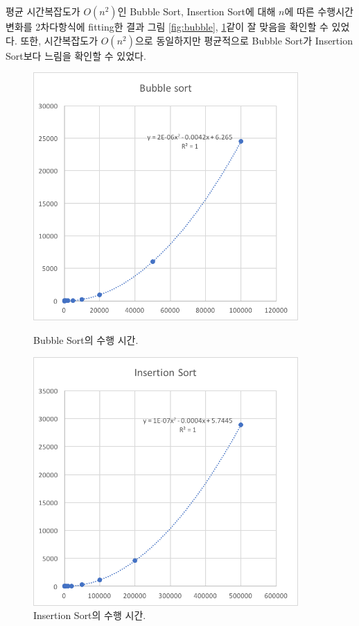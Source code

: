 \documentclass{article}
\begin{document}
	\clearpage
	평균 시간복잡도가 $ O(n^{2}) $인 Bubble Sort, Insertion Sort에 대해
	$ n $에 따른 수행시간 변화를 2차다항식에 fitting한 결과
	그림 \ref{fig:bubble}, \ref{fig:insertion}\와 같이 잘 맞음을 확인할 수 있었다.
	또한, 시간복잡도가 $ O(n^{2}) $으로 동일하지만
	평균적으로 Bubble Sort가 Insertion Sort보다 느림을 확인할 수 있었다.
	\begin{figure}[h]
		\centering
		\hfill
		\begin{minipage}{0.45\textwidth}
			\centering
			\includegraphics[width=0.9\textwidth]{B.png}
			\caption{Bubble Sort의 수행 시간.}
			\label{fig:bubble}
		\end{minipage}
		\hfill
		\begin{minipage}{0.45\textwidth}
			\centering
			\includegraphics[width=0.9\textwidth]{I.png}
			\caption{Insertion Sort의 수행 시간.}
			\label{fig:insertion}
		\end{minipage}
		\hfill
	\end{figure}
\end{document}
